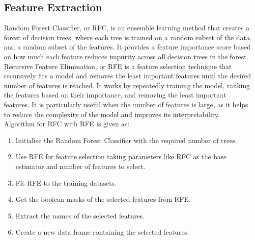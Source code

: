 \subsection{Feature Extraction}
\vspace{-18pt}
Random Forest Classifier, or RFC, is an ensemble learning method that creates a forest of decision trees, where each tree is trained on a random subset of the data, and a random subset of the features. It provides a feature importance score based on how much each feature reduces impurity across all decision trees in the forest. Recursive Feature Elimination, or RFE is a feature selection technique that recursively fits a model and removes the least important features until the desired number of features is reached. It works by repeatedly training the model, ranking the features based on their importance, and removing the least important features. It is particularly useful when the number of features is large, as it helps to reduce the complexity of the model and improves its interpretability.
Algorithm for RFC with RFE is given as:
\begin{enumerate}[label=\roman*.]
\item Initialise the Random Forest Classifier with the required number of trees.
\item Use RFE for feature selection taking parameters like RFC as the base estimator and number of features to select.
\item Fit RFE to the training datasets.
\item Get the boolean masks of the selected features from RFE.
\item Extract the names of the selected features.
\item Create a new data frame containing the selected features.
\end{enumerate}
